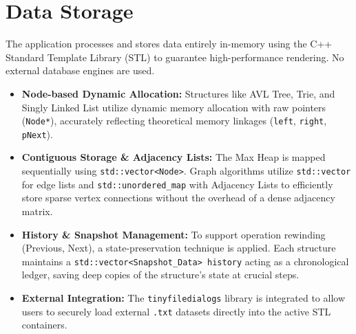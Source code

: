\section{Data Storage}
The application processes and stores data entirely in-memory using the C++ Standard Template Library (STL) to guarantee high-performance rendering. No external database engines are used.

\begin{itemize}
    \item \textbf{Node-based Dynamic Allocation:} Structures like AVL Tree, Trie, and Singly Linked List utilize dynamic memory allocation with raw pointers (\texttt{Node*}), accurately reflecting theoretical memory linkages (\texttt{left}, \texttt{right}, \texttt{pNext}).
    \item \textbf{Contiguous Storage \& Adjacency Lists:} The Max Heap is mapped sequentially using \texttt{std::\allowbreak vector<Node>}. Graph algorithms utilize \texttt{std::vector} for edge lists and \texttt{std::\allowbreak unordered\_map} with Adjacency Lists to efficiently store sparse vertex connections without the overhead of a dense adjacency matrix.
    \item \textbf{History \& Snapshot Management:} To support operation rewinding (Previous, Next), a state-preservation technique is applied. Each structure maintains a \texttt{std::vector<Snapshot\_Data> \allowbreak history} acting as a chronological ledger, saving deep copies of the structure's state at crucial steps.
    \item \textbf{External Integration:} The \texttt{tinyfiledialogs} library is integrated to allow users to securely load external \texttt{.txt} datasets directly into the active STL containers.
\end{itemize}